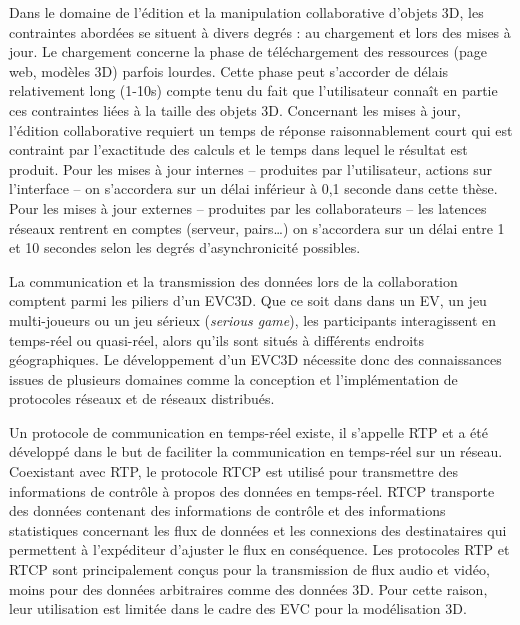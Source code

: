 Dans le domaine de l'édition et la manipulation collaborative 
d'objets 3D, les contraintes abordées se situent à divers degrés : au chargement 
et lors des mises à jour. Le chargement concerne la phase de téléchargement des ressources (page web, modèles 3D) parfois lourdes. Cette phase peut s'accorder de délais 
relativement long (1-10s) compte tenu du fait que l'utilisateur connaît en partie ces 
contraintes liées à la taille des objets 3D. Concernant les mises à jour, l'édition 
collaborative requiert un temps de réponse raisonnablement court qui est contraint par 
l'exactitude des calculs et le temps dans lequel le résultat est produit. Pour les 
mises à jour internes -- produites par l'utilisateur, actions sur l'interface -- on 
s'accordera sur un délai inférieur à 0,1 seconde dans cette thèse. 
Pour les mises à jour externes -- produites par les collaborateurs -- les latences 
réseaux rentrent en comptes (serveur, pairs\ldots) on s'accordera sur un délai 
entre 1 et 10 secondes selon les degrés d'asynchronicité 
possibles. 





La communication et la transmission des données lors de la collaboration comptent parmi les piliers d'un \gls{EVC3D}. Que ce soit dans dans un 
\gls{EV}, un jeu multi-joueurs ou un jeu sérieux (\textit{serious game}), les 
participants interagissent en temps-réel ou quasi-réel, alors qu'ils sont situés à 
différents endroits géographiques. 
Le développement d'un \gls{EVC3D} nécessite donc des connaissances issues de 
plusieurs domaines comme la conception et l'implémentation de protocoles 
réseaux et de réseaux distribués.

Un protocole de communication en temps-réel existe, il s'appelle \gls{RTP} et a 
été développé dans le but de faciliter la communication en temps-réel sur un 
réseau. Coexistant avec \gls{RTP}, le protocole \gls{RTCP} est utilisé pour 
transmettre des informations de contrôle à propos des données en temps-réel. 
\gls{RTCP} transporte des données contenant des informations de contrôle et des 
informations statistiques concernant les flux de données et les connexions des 
destinataires qui permettent à l'expéditeur d'ajuster le flux en conséquence. Les 
protocoles \gls{RTP} et \gls{RTCP} sont principalement conçus pour la 
transmission de flux audio et vidéo, moins pour des données arbitraires comme 
des données 3D. Pour cette raison, leur utilisation est limitée dans le cadre des 
\gls{EVC} pour la modélisation 3D. 

